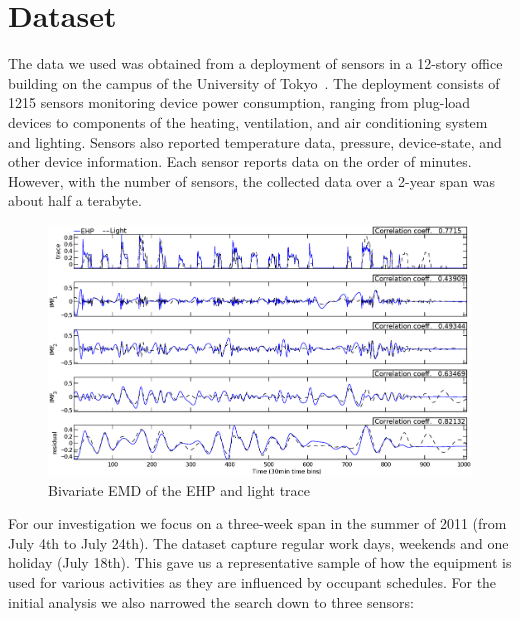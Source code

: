 \section{Dataset}
The data we used was obtained from a deployment of sensors in a 12-story office building
on the campus of the University of Tokyo~\cite{gutp, ogawa:lncs2011}.  The deployment consists of 
1215 sensors monitoring device power consumption, ranging from plug-load devices to components of the
heating, ventilation, and air conditioning system and lighting.  Sensors also reported temperature
data, pressure, device-state, and other device information.  Each sensor reports data on the
order of minutes.  However, with the number of sensors, the collected data over a 2-year
span was about half a terabyte.


\begin{figure}[tb]
\hspace{-2cm}
\includegraphics[width=1.2\textwidth]{img/emd_25_26.eps}
\vspace{-1cm}
\caption{Bivariate EMD of the EHP and light trace}
\label{fig:emd}
\end{figure}



For our investigation we focus on a three-week span in the summer of 2011 (from July 4th to July 24th).
The dataset capture regular work days, weekends and one holiday (July 18th).  This gave us a representative sample
of how the equipment is used for various activities as they are influenced by occupant schedules.  For the initial
analysis we also narrowed the search down to three sensors:

